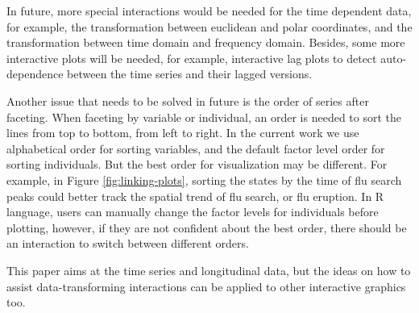 \documentclass[12pt]{article}
\begin{document}
In future, more special interactions would be needed for the time
dependent data, for example, the transformation between euclidean
and polar coordinates, and the transformation between time domain
and frequency domain. Besides, some more interactive plots will
be needed, for example, interactive lag plots to detect auto-dependence
between the time series and their lagged versions.

Another issue that needs to be solved in future is the order of
series after faceting. When faceting by variable or individual,
an order is needed to sort the lines from top to bottom, from
left to right. In the current work we use alphabetical order for
sorting variables, and the default factor level order for sorting
individuals. But the best order for visualization may be different.
For example, in Figure \ref{fig:linking-plots}, sorting the states
by the time of flu search peaks could better track the spatial
trend of flu search, or flu eruption. In R language, users can
manually change the factor levels for individuals before plotting,
however, if they are not confident about the best order, there
should be an interaction to switch between different orders.

This paper aims at the time series and longitudinal data, but the
ideas on how to assist data-transforming interactions can be applied
to other interactive graphics too.



\end{document}
